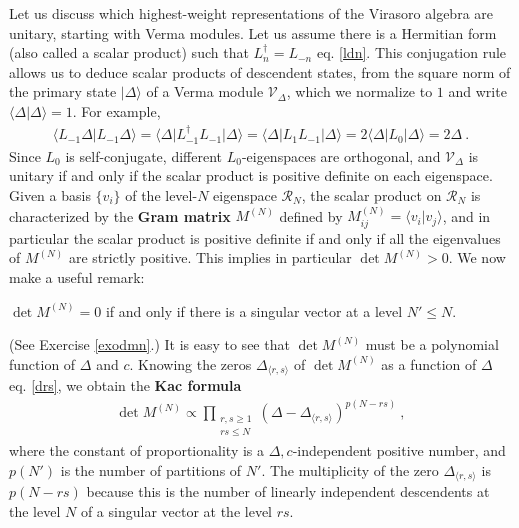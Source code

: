 \documentclass[12pt, a4paper, notitlepage, twoside]{report}
\numberwithin{equation}{section}
\theoremstyle{break}
\begin{document}
Let us discuss which highest-weight representations of the Virasoro algebra are unitary, starting with Verma modules. Let us assume there is a Hermitian form (also called a scalar product) such that $L_n^\dagger = L_{-n}$ eq. \eqref{ldn}.
This conjugation rule allows us to deduce scalar products of descendent states, from the square norm of the primary state $|\Delta\rangle$ of a Verma module $\mathcal{V}_\Delta$, which we normalize to $1$ and write  $\langle \Delta|\Delta\rangle =1$. 
For example,
\begin{align}
 \langle L_{-1} \Delta|L_{-1}\Delta\rangle = \langle \Delta |L_{-1}^\dagger L_{-1}|\Delta\rangle =\langle \Delta |L_1 L_{-1}|\Delta\rangle = 2\langle \Delta|L_0|\Delta\rangle = 2\Delta\ . 
\label{levo} 
\end{align}
Since $L_0$ is self-conjugate, different $L_0$-eigenspaces are orthogonal, and $\mathcal V_\Delta$ is unitary if and only if the scalar product is positive definite on each eigenspace. 
Given a basis $\{v_i\}$ of the level-$N$ eigenspace $\mathcal{R}_N$, the scalar product on $\mathcal{R}_N$ is characterized by the \textbf{Gram matrix} $M^{(N)}$ defined by $M^{(N)}_{ij}=\langle v_i|v_j\rangle$, and in particular the scalar product is positive definite if and only if all the eigenvalues of $M^{(N)}$ are strictly positive. This implies in particular $\det M^{(N)}>0$.
We now make a useful remark:
\begin{center}
 \begin{minipage}{0.9\textwidth}
 $\det M^{(N)}=0$ if and only if there is a singular vector at a level $N'\leq N$.  
 \end{minipage}
\end{center}
(See Exercise \ref{exodmn}.) 
It is easy to see that $\det M^{(N)}$ must be a polynomial function of $\Delta$ and $c$.
Knowing the zeros $\Delta_{\langle r,s \rangle}$ of $\det M^{(N)}$ as a function of $\Delta$ eq. \eqref{drs}, we obtain the \textbf{\boldmath Kac formula} 
\begin{align}
 \boxed{\det M^{(N)} \propto \prod_{\begin{smallmatrix} r,s\geq 1 \\ rs \leq N \end{smallmatrix}} (\Delta-\Delta_{\langle r,s \rangle})^{p(N-rs)}} \ ,
\end{align}
where the constant of proportionality is a $\Delta,c$-independent positive number, and $p(N')$ is the number of partitions of $N'$.
The multiplicity of the zero $\Delta_{\langle r,s \rangle}$ is $p(N-rs)$ because this is the number of linearly independent descendents at the level $N$ of a singular vector at the level $rs$.  
\end{document}
